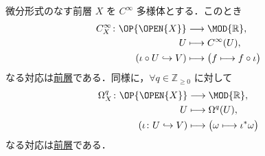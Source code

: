 \documentclass[TQFT_main]{subfiles}
\begin{document}
\begin{myexample}[label=ex:presheaf-diff]{微分形式のなす前層}
    $X$ を $C^\infty$ 多様体とする．このとき
    \begin{align}
        C^\infty_X \colon \OP{\OPEN{X}} &\lto \MOD{\mathbb{R}}, \\
        U &\lmto C^\infty (U), \\
        (\iota \circ U \hookrightarrow V) &\lmto \bigl( f \lmto f \circ \iota \bigr) 
    \end{align}
    なる対応は\hyperref[def:presheaf]{前層}である．同様に，$\forall q \in \mathbb{Z}_{\ge 0}$ に対して
    \begin{align}
        \Omega^q_X \colon \OP{\OPEN{X}} &\lto \MOD{\mathbb{R}}, \\
        U &\lmto \Omega^q (U), \\
        (\iota \colon U \hookrightarrow V) &\lmto \bigl( \omega \lmto \iota^* \omega \bigr) 
    \end{align}
    なる対応は\hyperref[def:presheaf]{前層}である．
\end{myexample}

    
\end{document}
